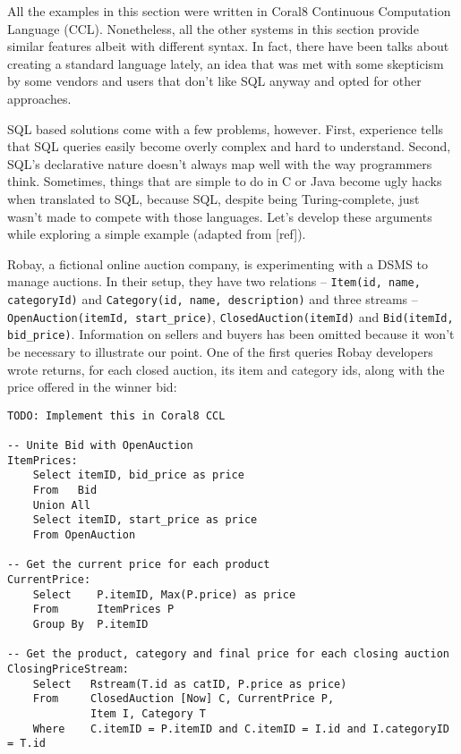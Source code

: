 \documentclass{report}
\begin{document}
All the examples in this section were written in Coral8 Continuous
Computation Language (CCL). Nonetheless, all the other systems in this
section provide similar features albeit with different syntax. In
fact, there have been talks about creating a standard language lately,
an idea that was met with some skepticism by some vendors and users
that don't like SQL anyway and opted for other approaches.

SQL based solutions come with a few problems, however. First,
experience tells that SQL queries easily become overly complex and
hard to understand. Second, SQL's declarative nature doesn't always
map well with the way programmers think. Sometimes, things that are
simple to do in C or Java become ugly hacks when translated to SQL,
because SQL, despite being Turing-complete, just wasn't made to
compete with those languages. Let's develop these arguments while
exploring a simple example (adapted from [ref]).

Robay, a fictional online auction company, is experimenting with a
DSMS to manage auctions. In their setup, they have two relations --
\verb=Item(id, name, categoryId)= and
\verb=Category(id, name, description)= and three streams --
\verb=OpenAuction(itemId, start_price)=, \verb=ClosedAuction(itemId)=
and \verb=Bid(itemId, bid_price)=. Information on sellers and buyers
has been omitted because it won't be necessary to illustrate our
point. One of the first queries Robay developers wrote returns, for
each closed auction, its item and category ids, along with the price
offered in the winner bid:

\begin{verbatim}
TODO: Implement this in Coral8 CCL

-- Unite Bid with OpenAuction
ItemPrices:
    Select itemID, bid_price as price 
    From   Bid 
    Union All
    Select itemID, start_price as price 
    From OpenAuction

-- Get the current price for each product
CurrentPrice: 
    Select    P.itemID, Max(P.price) as price
    From      ItemPrices P
    Group By  P.itemID

-- Get the product, category and final price for each closing auction
ClosingPriceStream:
    Select   Rstream(T.id as catID, P.price as price)
    From     ClosedAuction [Now] C, CurrentPrice P, 
             Item I, Category T    
    Where    C.itemID = P.itemID and C.itemID = I.id and I.categoryID = T.id 
\end{verbatim}
\end{document}
